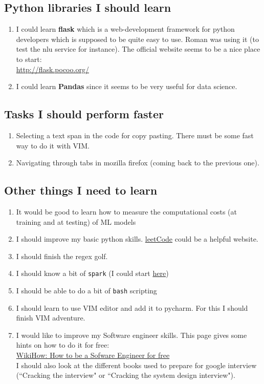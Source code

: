 \documentclass[11pt,a4paper]{article}
\begin{document}
\subsection{Python libraries I should learn}
\begin{enumerate}
\item I could learn \textbf{flask} which is  a web-development framework for python developers which is supposed to be quite easy to use. Roman was using it (to test the nlu service for instance). The official website seems to be a nice place to start:\\
\url{http://flask.pocoo.org/}
\item I could learn \textbf{Pandas} since it seems to be very useful for data science.
\end{enumerate}

\subsection{Tasks I should perform faster}
\begin{enumerate}
\item Selecting a text span in the code for copy pasting. There must be some fast way to do it with VIM.
\item Navigating through tabs in mozilla firefox (coming back to the previous one).
\end{enumerate}

\subsection{Other things I need to learn}
\begin{enumerate}
\item It would be good to learn how to measure the computational costs (at training and at testing) of ML models
\item I should improve my basic python skills. \href{https://leetcode.com/problemset/all/}{leetCode} could be a helpful website.
\item I should finish the regex golf.
\item I should know a bit of \texttt{spark} (I could start \href{https://www.kdnuggets.com/2015/11/introduction-spark-python.html}{here})
\item I should be able to do a bit of \texttt{bash} scripting
\item I should learn to use VIM editor and add it to pycharm. For this I should finish VIM adventure.
\item I would like to improve my Software engineer skills. This page gives some hints on how to do it for free:\\
\href{https://www.wikihow.com/Learn-How-to-Be-a-Software-Engineer-for-Free#}{WikiHow: How to be a Sofware Engineer for free}\\
I should also look at the different books used to prepare for google interview (``Cracking the interview" or ``Cracking the system design interview").
\end{enumerate}
\end{document}
